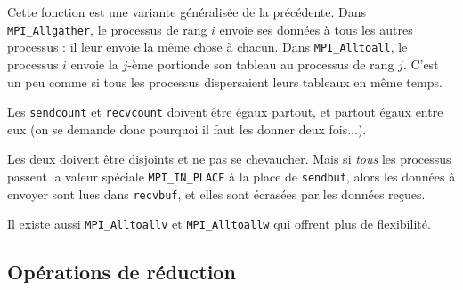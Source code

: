 Cette fonction est une variante généralisée de la précédente. Dans
\verb|MPI_Allgather|, le processus de rang $i$ envoie ses données à
tous les autres processus : il leur envoie la même chose à
chacun. Dans \verb|MPI_Alltoall|, le processus $i$ envoie la $j$-ème
\og portion\fg de son tableau au processus de rang $j$. C'est un peu
comme si tous les processus dispersaient leurs tableaux en même temps.

Les \verb|sendcount| et  \verb|recvcount| doivent être égaux partout,
et partout égaux entre eux (on se demande donc pourquoi il faut les
donner deux fois...).

Les deux  doivent être disjoints et ne pas se chevaucher. Mais
si \emph{tous} les processus passent la valeur spéciale \verb|MPI_IN_PLACE| à la
place de \verb|sendbuf|, alors les données à envoyer sont lues dans
\verb|recvbuf|, et elles sont écrasées par les données reçues.

\begin{ddanger} Il existe aussi \verb|MPI_Alltoallv| et \verb|MPI_Alltoallw| qui
  offrent plus de flexibilité.
\end{ddanger}

\begin{center}
\end{center}

\subsection{Opérations de \og réduction\fg}

